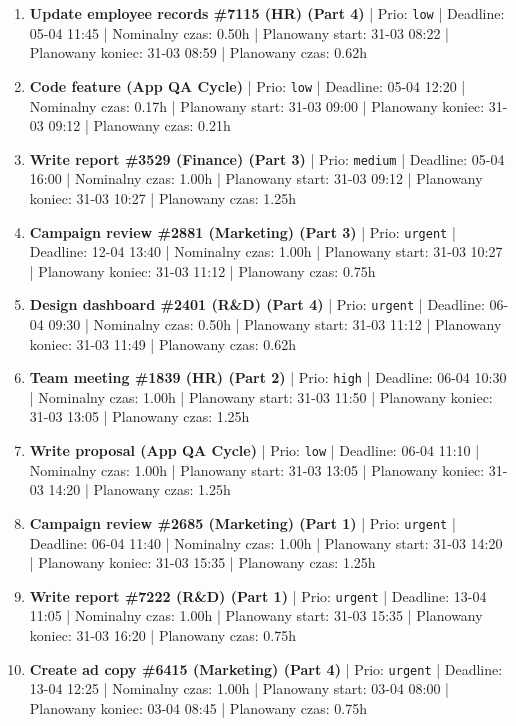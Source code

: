 {\begin{enumerate}
  \item [\textbf{14701}] \textbf{Update employee records \#7115 (HR) (Part 4)} | Prio: \texttt{low} | Deadline: 05-04 11:45 | Nominalny czas: 0.50h | Planowany start: 31-03 08:22 | Planowany koniec: 31-03 08:59 | Planowany czas: 0.62h
  \item [\textbf{14703}] \textbf{Code feature (App QA Cycle)} | Prio: \texttt{low} | Deadline: 05-04 12:20 | Nominalny czas: 0.17h | Planowany start: 31-03 09:00 | Planowany koniec: 31-03 09:12 | Planowany czas: 0.21h
  \item [\textbf{14672}] \textbf{Write report \#3529 (Finance) (Part 3)} | Prio: \texttt{medium} | Deadline: 05-04 16:00 | Nominalny czas: 1.00h | Planowany start: 31-03 09:12 | Planowany koniec: 31-03 10:27 | Planowany czas: 1.25h
  \item [\textbf{14599}] \textbf{Campaign review \#2881 (Marketing) (Part 3)} | Prio: \texttt{urgent} | Deadline: 12-04 13:40 | Nominalny czas: 1.00h | Planowany start: 31-03 10:27 | Planowany koniec: 31-03 11:12 | Planowany czas: 0.75h
  \item [\textbf{14603}] \textbf{Design dashboard \#2401 (R\&D) (Part 4)} | Prio: \texttt{urgent} | Deadline: 06-04 09:30 | Nominalny czas: 0.50h | Planowany start: 31-03 11:12 | Planowany koniec: 31-03 11:49 | Planowany czas: 0.62h
  \item [\textbf{14610}] \textbf{Team meeting \#1839 (HR) (Part 2)} | Prio: \texttt{high} | Deadline: 06-04 10:30 | Nominalny czas: 1.00h | Planowany start: 31-03 11:50 | Planowany koniec: 31-03 13:05 | Planowany czas: 1.25h
  \item [\textbf{14695}] \textbf{Write proposal (App QA Cycle)} | Prio: \texttt{low} | Deadline: 06-04 11:10 | Nominalny czas: 1.00h | Planowany start: 31-03 13:05 | Planowany koniec: 31-03 14:20 | Planowany czas: 1.25h
  \item [\textbf{14607}] \textbf{Campaign review \#2685 (Marketing) (Part 1)} | Prio: \texttt{urgent} | Deadline: 06-04 11:40 | Nominalny czas: 1.00h | Planowany start: 31-03 14:20 | Planowany koniec: 31-03 15:35 | Planowany czas: 1.25h
  \item [\textbf{14601}] \textbf{Write report \#7222 (R\&D) (Part 1)} | Prio: \texttt{urgent} | Deadline: 13-04 11:05 | Nominalny czas: 1.00h | Planowany start: 31-03 15:35 | Planowany koniec: 31-03 16:20 | Planowany czas: 0.75h
  \item [\textbf{14602}] \textbf{Create ad copy \#6415 (Marketing) (Part 4)} | Prio: \texttt{urgent} | Deadline: 13-04 12:25 | Nominalny czas: 1.00h | Planowany start: 03-04 08:00 | Planowany koniec: 03-04 08:45 | Planowany czas: 0.75h

\end{enumerate}}
